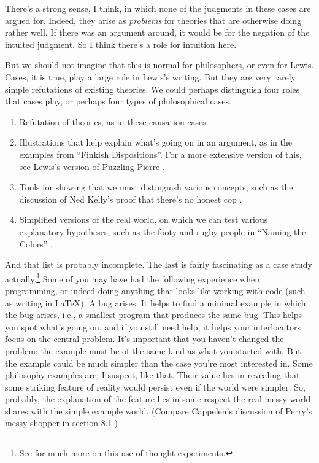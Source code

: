\noindent There's a strong sense, I think, in which none of the judgments in these cases are argued for. Indeed, they arise as \textit{problems} for theories that are otherwise doing rather well. If there was an argument around, it would be for the negation of the intuited judgment. So I think there's a role for intuition here.

But we should not imagine that this is normal for philosophers, or even for Lewis. Cases, it is true, play a large role in Lewis's writing. But they are very rarely simple refutations of existing theories. We could perhaps distinguish four roles that cases play, or perhaps four types of philosophical cases.

\begin{enumerate}
\item Refutation of theories, as in these causation cases.
\item Illustrations that help explain what's going on in an argument, as in the examples from ``Finkish Dispositions''. For a more extensive version of this, see Lewis's version of Puzzling Pierre \citep{Lewis1981d}. 
\item Tools for showing that we must distinguish various concepts, such as the discussion of Ned Kelly's proof that there's no honest cop \citep{Lewis1988f}.
\item Simplified versions of the real world, on which we can test various explanatory hypotheses, such as the footy and rugby people in ``Naming the Colors'' \citep{Lewis1997c}.
\end{enumerate}

\noindent And that list is probably incomplete. The last is fairly fascinating as a case study actually.\footnote{See \citet{Sugden2000, Sugden2009} for much more on this use of thought experiments.} Some of you may have had the following experience when programming, or indeed doing anything that looks like working with code (such as writing in \LaTeX). A bug arises. It helps to find a minimal example in which the bug arises, i.e., a smallest program that produces the same bug. This helps you spot what's going on, and if you still need help, it helps your interlocutors focus on the central problem. It's important that you haven't changed the problem; the example must be of the same kind as what you started with. But the example could be much simpler than the case you're most interested in. Some philosophy examples are, I suspect, like that. Their value lies in revealing that some striking feature of reality would persist even if the world were simpler. So, probably, the explanation of the feature lies in some respect the real messy world shares with the simple example world. (Compare Cappelen's discussion of Perry's messy shopper in section 8.1.) 

